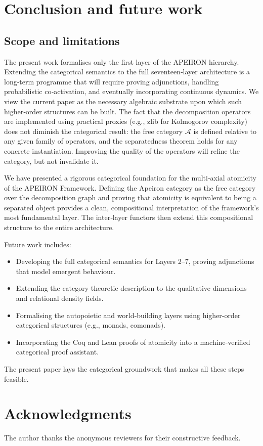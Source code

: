 \section{Conclusion and future work}\label{sec:concl}
\subsection*{Scope and limitations}
The present work formalises only the first layer of the APEIRON hierarchy.
Extending the categorical semantics to the full seventeen‑layer architecture is a long‑term programme that will require proving adjunctions, handling probabilistic co‑activation, and eventually incorporating continuous dynamics.
We view the current paper as the necessary algebraic substrate upon which such higher‑order structures can be built.
The fact that the decomposition operators are implemented using practical proxies (e.g., zlib for Kolmogorov complexity) does not diminish the categorical result: the free category $\mathcal{A}$ is defined relative to any given family of operators, and the separatedness theorem holds for any concrete instantiation.
Improving the quality of the operators will refine the category, but not invalidate it.

We have presented a rigorous categorical foundation for the multi‑axial atomicity of the APEIRON Framework.
Defining the Apeiron category as the free category over the decomposition graph and proving that atomicity is equivalent to being a separated object provides a clean, compositional interpretation of the framework's most fundamental layer.
The inter‑layer functors then extend this compositional structure to the entire architecture.

Future work includes:
\begin{itemize}
\item Developing the full categorical semantics for Layers 2–7, proving adjunctions that model emergent behaviour.
\item Extending the category‑theoretic description to the qualitative dimensions and relational density fields.
\item Formalising the autopoietic and world‑building layers using higher‑order categorical structures (e.g., monads, comonads).
\item Incorporating the Coq and Lean proofs of atomicity into a machine‑verified categorical proof assistant.
\end{itemize}

The present paper lays the categorical groundwork that makes all these steps feasible.

\section*{Acknowledgments}
The author thanks the anonymous reviewers for their constructive feedback.